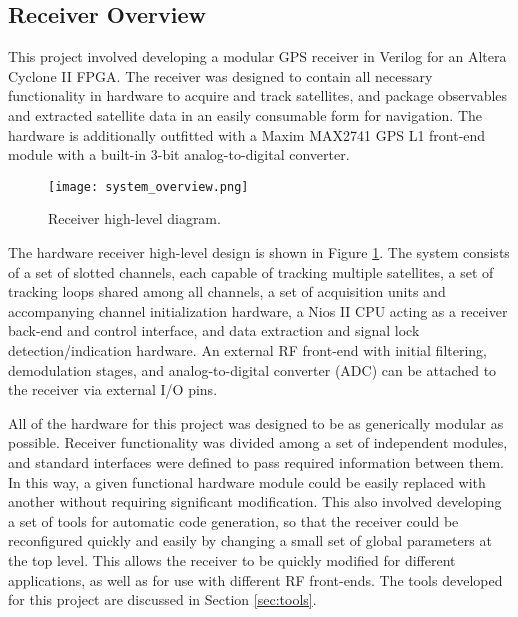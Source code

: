 \documentclass[12pt]{article}
\begin{document}
\subsection{Receiver Overview}
This project involved developing a modular GPS receiver in Verilog for an Altera Cyclone II FPGA. The receiver was designed to contain all necessary functionality in hardware to acquire and track satellites, and package observables and extracted satellite data in an easily consumable form for navigation. The hardware is additionally outfitted with a Maxim MAX2741 GPS L1 front-end module with a built-in 3-bit analog-to-digital converter.

\begin{figure}
\centering
\texttt{[image: system\_overview.png]}
\caption{Receiver high-level diagram.}
\label{img:overview}
\end{figure}

The hardware receiver high-level design is shown in Figure \ref{img:overview}. The system consists of a set of slotted channels, each capable of tracking multiple satellites, a set of tracking loops shared among all channels, a set of acquisition units and accompanying channel initialization hardware, a Nios II CPU acting as a receiver back-end and control interface, and data extraction and signal lock detection/indication hardware. An external RF front-end with initial filtering, demodulation stages, and analog-to-digital converter (ADC) can be attached to the receiver via external I/O pins.

All of the hardware for this project was designed to be as generically modular as possible. Receiver functionality was divided among a set of independent modules, and standard interfaces were defined to pass required information between them. In this way, a given functional hardware module could be easily replaced with another without requiring significant modification. This also involved developing a set of tools for automatic code generation, so that the receiver could be reconfigured quickly and easily by changing a small set of global parameters at the top level. This allows the receiver to be quickly modified for different applications, as well as for use with different RF front-ends. The tools developed for this project are discussed in Section \ref{sec:tools}.
\end{document}
